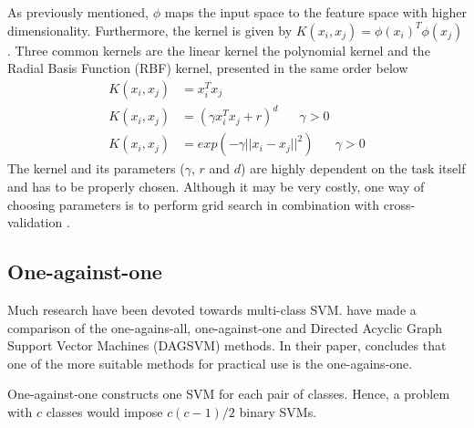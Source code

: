\begin{comment}
Thus, the SVM will find the hyperplane which maximizes the margin by solving the following problem \citep{Hsu10apractical}
\begin{align}
    \nonumber
    \min_{\bm{w},b,\bm{\xi}}\text{~~}&\frac{1}{2}\bm{w}^T\bm{w}+C\sum_{i=1}^{n} \xi_i \\ 
    \text{subject to~~}&y_i(\bm{w}^T\phi(\bm{x}_i)+1)\geq 1-\xi_i\\ 
    &\xi_i\geq 0 \nonumber
\end{align}
where $\phi(\bm{x}_i)$ is a mapping of $\bm{x}_i$ to a higher dimension and $C>0$ is the penalty parameter for the error term. Solving this problem will find you a hyperplane to set the boundary decision line in the high dimensional space $\phi$.
\end{comment}

As previously mentioned, $\phi$ maps the input space to the feature space with higher dimensionality. Furthermore, the kernel is given by $K(x_i,x_j)=\phi(x_i)^T\phi(x_j)$. Three common kernels are the linear kernel the polynomial kernel and the Radial Basis Function (RBF) kernel, presented in the same order below
\begin{align}
K(x_i,x_j)&=x_i^Tx_j\\ \nonumber
K(x_i,x_j)&=(\gamma x_i^T x_j + r)^d \text{~~~~~}\gamma>0\\
K(x_i,x_j)&=exp(-\gamma ||x_i-x_j||^2) \text{~~~~~}\gamma>0 \nonumber
\end{align}
The kernel and its parameters ($\gamma$, $r$ and $d$) are highly dependent on the task itself and has to be properly chosen. Although it may be very costly, one way of choosing parameters is to perform grid search in combination with cross-validation \citep{Hsu10apractical}.


\subsection{One-against-one}
Much research have been devoted towards multi-class SVM. \citet{Hsu2002} have made a comparison of the one-agains-all, one-against-one and Directed Acyclic Graph Support Vector Machines (DAGSVM) methods. In their paper, \citet{Hsu2002} concludes that one of the more suitable methods for practical use is the one-agains-one.

One-against-one constructs one SVM for each pair of classes. Hence, a problem with $c$ classes would impose $c(c-1)/2$ binary SVMs.

